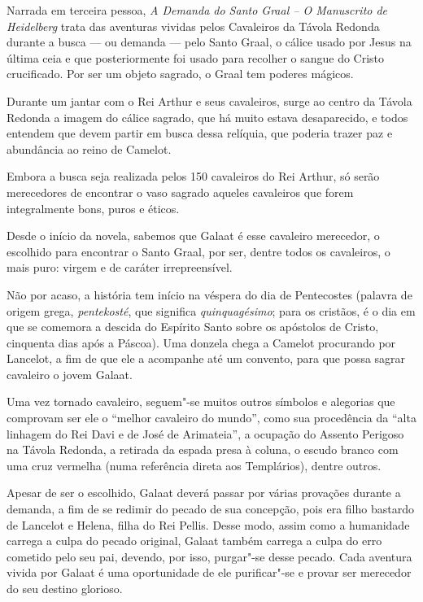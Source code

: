 Narrada em terceira pessoa, \emph{A Demanda do Santo Graal -- O
Manuscrito de Heidelberg} trata das aventuras vividas pelos
Cavaleiros da Távola Redonda durante a busca --- ou demanda ---
pelo Santo Graal, o cálice usado por Jesus na última ceia e que
posteriormente foi usado para recolher o sangue do Cristo crucificado.
Por ser um objeto sagrado, o Graal tem poderes mágicos.

Durante um jantar com o Rei Arthur e seus cavaleiros, surge ao centro da
Távola Redonda a imagem do cálice sagrado, que há muito estava
desaparecido, e todos entendem que devem partir em busca dessa relíquia,
que poderia trazer paz e abundância ao reino de Camelot.

Embora a busca seja realizada pelos 150 cavaleiros do Rei Arthur, só
serão merecedores de encontrar o vaso sagrado aqueles cavaleiros que
forem integralmente bons, puros e éticos.

Desde o início da novela, sabemos que Galaat é esse cavaleiro merecedor,
o escolhido para
encontrar o Santo Graal, por ser, dentre todos os cavaleiros, o mais
puro: virgem e de caráter irrepreensível.

Não por acaso, a história tem início na véspera
do dia de Pentecostes (palavra de origem grega, \emph{pentekosté}, que
significa \emph{quinquagésimo}; para os cristãos, é o dia em que se
comemora a descida do Espírito Santo sobre os apóstolos de Cristo,
cinquenta dias após a Páscoa). Uma donzela chega a Camelot procurando
por Lancelot, a fim de que ele a acompanhe até um convento, para que
possa sagrar cavaleiro o jovem Galaat.

Uma vez tornado cavaleiro, seguem"-se muitos outros símbolos e
alegorias que comprovam ser ele o ``melhor cavaleiro do mundo'', como
sua procedência da ``alta linhagem do Rei Davi e de José de Arimateia'',
a ocupação do Assento Perigoso na Távola Redonda, a retirada da espada
presa à coluna, o escudo branco com uma cruz vermelha (numa referência
direta aos Templários), dentre outros.

Apesar de ser o escolhido, Galaat deverá passar por várias
provações durante a demanda, a fim de se redimir do pecado de sua
concepção, pois era filho bastardo de Lancelot e Helena, filha do Rei
Pellis. Desse modo, assim como a humanidade carrega a culpa do pecado
original, Galaat também carrega a culpa do erro cometido pelo seu pai,
devendo, por isso, purgar"-se desse pecado. Cada aventura vivida por
Galaat é uma oportunidade de ele purificar"-se e provar ser merecedor do
seu destino glorioso.

